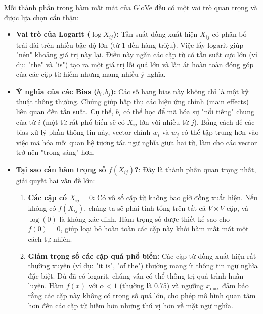 \begin{tcolorbox}[
    title=Giải mã Hàm mất mát của GloVe,
    colback=orange!5!white, colframe=orange!60!black, fonttitle=\bfseries
]
Mỗi thành phần trong hàm mất mát của GloVe đều có một vai trò quan trọng và được lựa chọn cẩn thận:
\begin{itemize}
    \item \textbf{Vai trò của Logarit ($\log X_{ij}$):} Tần suất đồng xuất hiện $X_{ij}$ có phân bố trải dài trên nhiều bậc độ lớn (từ 1 đến hàng triệu). Việc lấy logarit giúp "nén" khoảng giá trị này lại. Điều này ngăn các cặp từ có tần suất cực lớn (ví dụ: "the" và "is") tạo ra một giá trị lỗi quá lớn và lấn át hoàn toàn đóng góp của các cặp từ hiếm nhưng mang nhiều ý nghĩa.

    \item \textbf{Ý nghĩa của các Bias ($b_i, b_j$):} Các số hạng bias này không chỉ là một kỹ thuật thông thường. Chúng giúp hấp thụ các hiệu ứng chính (main effects) liên quan đến tần suất. Cụ thể, $b_i$ có thể học để mã hóa sự "nổi tiếng" chung của từ $i$ (một từ rất phổ biến sẽ có $X_{ij}$ lớn với nhiều từ $j$). Bằng cách để các bias xử lý phần thông tin này, vector chính $w_i$ và $w_j$ có thể tập trung hơn vào việc mã hóa mối quan hệ tương tác ngữ nghĩa giữa hai từ, làm cho các vector trở nên "trong sáng" hơn.
    
    \item \textbf{Tại sao cần hàm trọng số $f(X_{ij})$?}: Đây là thành phần quan trọng nhất, giải quyết hai vấn đề lớn:
    \begin{enumerate}
        \item \textbf{Các cặp có $X_{ij} = 0$:} Có vô số cặp từ không bao giờ đồng xuất hiện. Nếu không có $f(X_{ij})$, chúng ta sẽ phải tính tổng trên tất cả $V \times V$ cặp, và $\log(0)$ là không xác định. Hàm trọng số được thiết kế sao cho $f(0) = 0$, giúp loại bỏ hoàn toàn các cặp này khỏi hàm mất mát một cách tự nhiên.
        \item \textbf{Giảm trọng số các cặp quá phổ biến:} Các cặp từ đồng xuất hiện rất thường xuyên (ví dụ: "it is", "of the") thường mang ít thông tin ngữ nghĩa đặc biệt. Dù đã có logarit, chúng vẫn có thể thống trị quá trình huấn luyện. Hàm $f(x)$ với $\alpha < 1$ (thường là 0.75) và ngưỡng $x_{\text{max}}$ đảm bảo rằng các cặp này không có trọng số quá lớn, cho phép mô hình quan tâm hơn đến các cặp từ hiếm hơn nhưng thú vị hơn về mặt ngữ nghĩa.
    \end{enumerate}
\end{itemize}
\end{tcolorbox}

